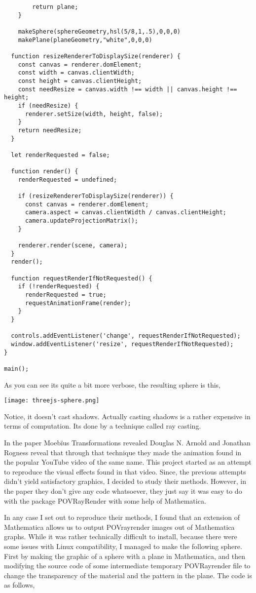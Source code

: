 \documentclass{article}
\begin{document}
\begin{verbatim}
		return plane;
	}

	makeSphere(sphereGeometry,hsl(5/8,1,.5),0,0,0)
	makePlane(planeGeometry,"white",0,0,0)

  function resizeRendererToDisplaySize(renderer) {
    const canvas = renderer.domElement;
    const width = canvas.clientWidth;
    const height = canvas.clientHeight;
    const needResize = canvas.width !== width || canvas.height !== height;
    if (needResize) {
      renderer.setSize(width, height, false);
    }
    return needResize;
  }

  let renderRequested = false;

  function render() {
    renderRequested = undefined;

    if (resizeRendererToDisplaySize(renderer)) {
      const canvas = renderer.domElement;
      camera.aspect = canvas.clientWidth / canvas.clientHeight;
      camera.updateProjectionMatrix();
    }

    renderer.render(scene, camera);
  }
  render();

  function requestRenderIfNotRequested() {
    if (!renderRequested) {
      renderRequested = true;
      requestAnimationFrame(render);
    }
  }

  controls.addEventListener('change', requestRenderIfNotRequested);
  window.addEventListener('resize', requestRenderIfNotRequested);
}

main();
\end{verbatim}
As you can see its quite a bit more verbose, the resulting sphere is
this,
\begin{center}
  \texttt{[image: threejs-sphere.png]}
  \end{center}
Notice, it doesn't cast shadows. Actually casting shadows is a rather
expensive in terms of computation. Its done by a technique called ray
casting.

In the paper Moeb\"ius Transformations revealed Douglas
N. Arnold and Jonathan Rogness reveal that through that technique they
made the animation found in the popular YouTube video of the same
name. This project started as an attempt to reproduce the visual
effects found in that video. Since, the previous attempts didn't yield
satisfactory graphics, I decided to study their methods. However, in
the paper they don't give any code whatsoever, they just say it was
easy to do with the package POVRayRender with some help of
Mathematica.

In any case I set out to reproduce their methods, I found that an
extension of Mathematica allows us to output POVrayrender images out
of Mathematica graphs. While it was rather technically difficult to
install, because there were some issues with Linux compatibility, I
managed to make the following sphere. First by making the graphic of a
sphere with a plane in Mathematica, and then modifying the source code
of some intermediate temporary POVRayrender file
to change the transparency of the material and the pattern in the
plane. The code is as follows,
\end{document}
